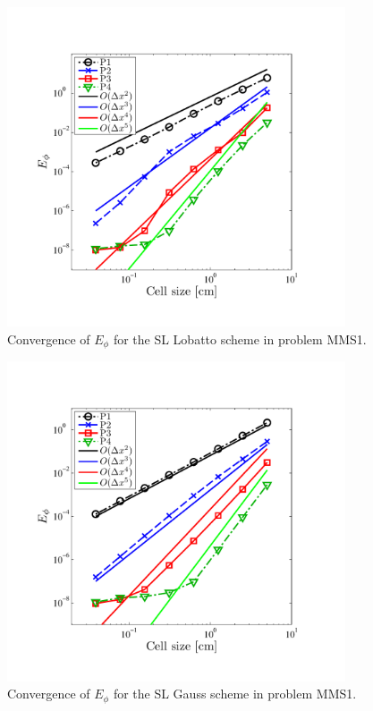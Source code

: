 %
%
\begin{figure}[!hbp]
\centering
\includegraphics[width=10cm,trim=0.25in  0.5in 0.75in 0.75in,clip=true]{chapter6_grey_radtran/Dissertation_Data/MMS2_SLXS_Lobatto_phi_L2.pdf}
\caption{Convergence of $E_{\phi}$ for the SL Lobatto scheme in problem MMS1.}
\label{fig:mms1_lobatto_phi}
\end{figure}
%
%
\begin{figure}[!htp]
\centering
\includegraphics[width=10cm,trim=0.25in  0.5in 0.75in 0.75in,clip=true]{chapter6_grey_radtran/Dissertation_Data/MMS2_SLXS_Gauss_phi_L2.pdf}
\caption{Convergence of $E_{\phi}$ for the SL Gauss scheme in problem MMS1.}
\label{fig:mms1_gauss_phi}
\end{figure}
%
